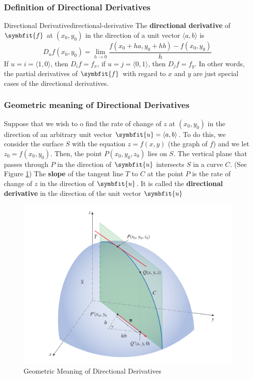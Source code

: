 \documentclass[math,code]{amznotes}
\theoremstyle{remark}
\begin{document}
\subsubsection{Definition of Directional Derivatives}
\begin{dfnbox}{Directional Derivative}{directional-derivative}
    The {\color{red} \textbf{directional derivative}} of $\symbfit{f}$ at $(x_0,y_0)$ in the direction of a unit vector $\langle a,b \rangle$ is
    \begin{equation}
        D_uf(x_0,y_0)=\lim\limits_{h \to 0} \frac{f(x_0+ha, y_0+hb)-f(x_0,y_0)}{h}
    \end{equation}
    If $u=i=\langle 1,0 \rangle$, then $D_if=f_x$, if $u=j=\langle 0,1 \rangle$, then $D_jf=f_y$. In other words, the partial derivatives of $\symbfit{f}$ with regard to $x$ and $y$ are just special cases of the directional derivatives.
\end{dfnbox}
\subsubsection{Geometric meaning of Directional Derivatives}
Suppose that we wish to o find the rate of change of $z$ at $(x_0,y_0)$ in the direction of an arbitrary unit vector $\symbfit{u}=\langle a,b \rangle$. To do this, we consider the surface $S$ with the equation $z=f(x,y)$ (the graph of $f$) and we let $z_0=f(x_0,y_0)$. Then, the point $P(x_0,y_0,z_0)$ lies on $S$. The vertical plane that passes through $P$ in the direction of $\symbfit{u}$ intersects $S$ in a curve $C$. (See Figure \ref{fig:geometric-meaing-of-directional-derivative}) The {\color{red} \textbf{slope}} of the tangent line $T$ to $C$ at the point $P$ is the rate of change of $z$ in the direction of $\symbfit{u}$. It is called the {\color{red} \textbf{directional derivative}} in the direction of the unit vector $\symbfit{u}$ 
\begin{figure}[H]
    \centering
    \includegraphics[width=0.5\linewidth]{images/geometric-meaing-of-directional-derivative.png}
    \caption{Geometric Meaning of Directional Derivatives}
    \label{fig:geometric-meaing-of-directional-derivative}
\end{figure}
\end{document}
